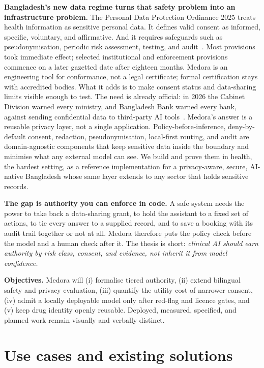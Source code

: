 \documentclass[12pt,twocolumn,a4paper]{article}
\begin{document}
\textbf{Bangladesh's new data regime turns that safety problem into an infrastructure
problem.} The Personal Data Protection Ordinance 2025 treats health information as
sensitive personal data. It defines valid consent as informed, specific, voluntary, and
affirmative. And it requires safeguards such as pseudonymisation, periodic risk assessment,
testing, and audit~\cite{pdpo}. Most provisions took immediate effect; selected
institutional and enforcement provisions commence on a later gazetted date after eighteen
months. Medora is an engineering tool for conformance, not a legal certificate; formal
certification stays with accredited bodies. What it adds is to make consent status and
data-sharing limits visible enough to test. The need is already official: in 2026 the Cabinet
Division warned every ministry, and Bangladesh Bank warned every bank, against sending
confidential data to third-party AI tools~\cite{cabinetai,bbai}. Medora's answer is a reusable
privacy layer, not a single application. Policy-before-inference, deny-by-default consent,
redaction, pseudonymisation, local-first routing, and audit are domain-agnostic components that
keep sensitive data inside the boundary and minimise what any external model can see. We build
and prove them in health, the hardest setting, as a reference implementation for a
privacy-aware, secure, AI-native Bangladesh whose same layer extends to any sector that holds
sensitive records.

\textbf{The gap is authority you can enforce in code.} A safe system needs the power to take
back a data-sharing grant, to hold the assistant to a fixed set of actions, to tie every answer
to a supplied record, and to save a booking with its audit trail together or not at all. Medora
therefore puts the policy check before the model and a human check after it. The thesis is short:
\emph{clinical AI should earn authority by risk class, consent, and evidence, not inherit it from
model confidence.}

\textbf{Objectives.} Medora will (i) formalise tiered authority, (ii) extend bilingual
safety and privacy evaluation, (iii) quantify the utility cost of narrower consent,
(iv) admit a locally deployable model only after red-flag and licence gates, and (v) keep
drug identity openly reusable. Deployed, measured, specified, and planned work remain
visually and verbally distinct.

\section{Use cases and existing solutions}
\end{document}
